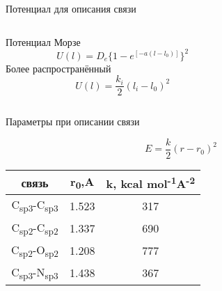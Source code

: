 \begin{frame}{Потенциал для описания связи}{}
\begin{minipage}{10cm}
\begin{columns}
\begin{column}{0.5\textwidth}
Потенциал Морзе 
$$ U(l)=D_e \{  1-e^{[-a(l-l_0)]} \}^2 $$
Более распространённый
$$ U(l)=\frac{{k_i}}{2} ( l_i - l_0)^2 $$
\end{column}
\begin{column}{0.5\textwidth}
 \small{}
\end{column}
\end{columns}
\end{minipage}
\end{frame}

\begin{frame}{Параметры при описании связи}
   \begin{center}

%
       \[ E=\frac{k}{2}(r-r_0)^2\]

\begin{tabular}{c c c}
\textbf{связь} & \textbf{r\textsubscript{0},A} & \textbf{k, kcal mol\textsuperscript{-1}A\textsuperscript{-2}} \\[0.2cm]
    \hline
C\textsubscript{sp3}-C\textsubscript{sp3} & 1.523 & 317 \\[0.2cm]
    \hline
C\textsubscript{sp2}-C\textsubscript{sp2} & 1.337 & 690 \\[0.2cm]
    \hline
C\textsubscript{sp2}-O\textsubscript{sp2} & 1.208 & 777 \\[0.2cm]
    \hline
C\textsubscript{sp3}-N\textsubscript{sp3} & 1.438 & 367 \\[0.2cm]
    \hline

\end{tabular}
\end{center}
\end{frame}

